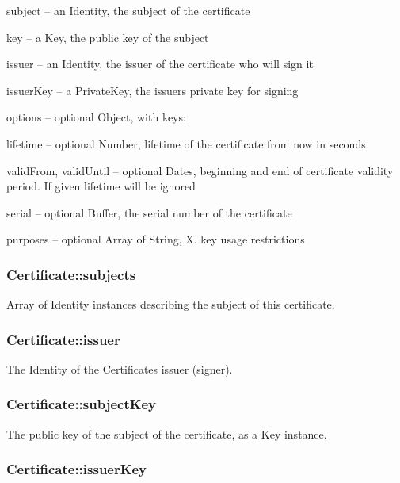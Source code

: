 \begin{DoxyItemize}
\item {\ttfamily subject} -- an Identity, the subject of the certificate
\item {\ttfamily key} -- a Key, the public key of the subject
\item {\ttfamily issuer} -- an Identity, the issuer of the certificate who will sign it
\item {\ttfamily issuer\+Key} -- a Private\+Key, the issuer\textquotesingle{}s private key for signing
\item {\ttfamily options} -- optional Object, with keys\+:
\begin{DoxyItemize}
\item {\ttfamily lifetime} -- optional Number, lifetime of the certificate from now in seconds
\item {\ttfamily valid\+From}, {\ttfamily valid\+Until} -- optional Dates, beginning and end of certificate validity period. If given {\ttfamily lifetime} will be ignored
\item {\ttfamily serial} -- optional Buffer, the serial number of the certificate
\item {\ttfamily purposes} -- optional Array of String, X. key usage restrictions
\end{DoxyItemize}
\end{DoxyItemize}

\subsubsection*{{\ttfamily Certificate\+::subjects}}

Array of {\ttfamily Identity} instances describing the subject of this certificate.

\subsubsection*{{\ttfamily Certificate\+::issuer}}

The {\ttfamily Identity} of the Certificate\textquotesingle{}s issuer (signer).

\subsubsection*{{\ttfamily Certificate\+::subject\+Key}}

The public key of the subject of the certificate, as a {\ttfamily Key} instance.

\subsubsection*{{\ttfamily Certificate\+::issuer\+Key}}

